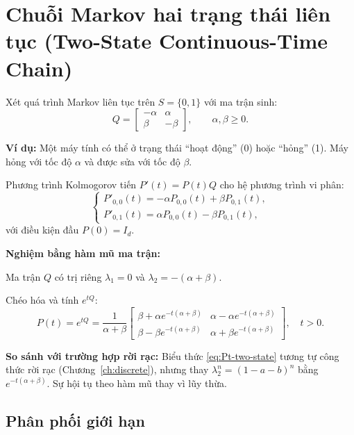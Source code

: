\section{Chuỗi Markov hai trạng thái liên tục (Two-State Continuous-Time Chain)}
\label{sec:two-state-continuous}

Xét quá trình Markov liên tục trên $S = \{0, 1\}$ với ma trận sinh:
\[
  Q = \begin{bmatrix} -\alpha & \alpha \\ \beta & -\beta \end{bmatrix}, \qquad \alpha, \beta \geq 0.
\]

\textbf{Ví dụ:} Một máy tính có thể ở trạng thái ``hoạt động'' (0) hoặc ``hỏng'' (1).
Máy hỏng với tốc độ $\alpha$ và được sửa với tốc độ $\beta$.

Phương trình Kolmogorov tiến $P'(t) = P(t) Q$ cho hệ phương trình vi phân:
\[
  \begin{cases}
    P'_{0,0}(t) = -\alpha P_{0,0}(t) + \beta P_{0,1}(t), \\
    P'_{0,1}(t) = \alpha P_{0,0}(t) - \beta P_{0,1}(t),
  \end{cases}
\]
với điều kiện đầu $P(0) = I_d$.

\textbf{Nghiệm bằng hàm mũ ma trận:}

Ma trận $Q$ có trị riêng $\lambda_1 = 0$ và $\lambda_2 = -(\alpha + \beta)$.

Chéo hóa và tính $e^{tQ}$:
\begin{equation}\label{eq:Pt-two-state}
  P(t) = e^{tQ} = \frac{1}{\alpha+\beta}
  \begin{bmatrix}
    \beta + \alpha e^{-t(\alpha+\beta)} & \alpha - \alpha e^{-t(\alpha+\beta)} \\
    \beta - \beta e^{-t(\alpha+\beta)} & \alpha + \beta e^{-t(\alpha+\beta)}
  \end{bmatrix}, \quad t > 0.
\end{equation}

\textbf{So sánh với trường hợp rời rạc:} Biểu thức \eqref{eq:Pt-two-state} tương tự công thức rời rạc (Chương~\ref{ch:discrete}), nhưng thay $\lambda_2^n = (1-a-b)^n$ bằng $e^{-t(\alpha+\beta)}$. Sự hội tụ theo hàm mũ thay vì lũy thừa.

\subsection{Phân phối giới hạn}

